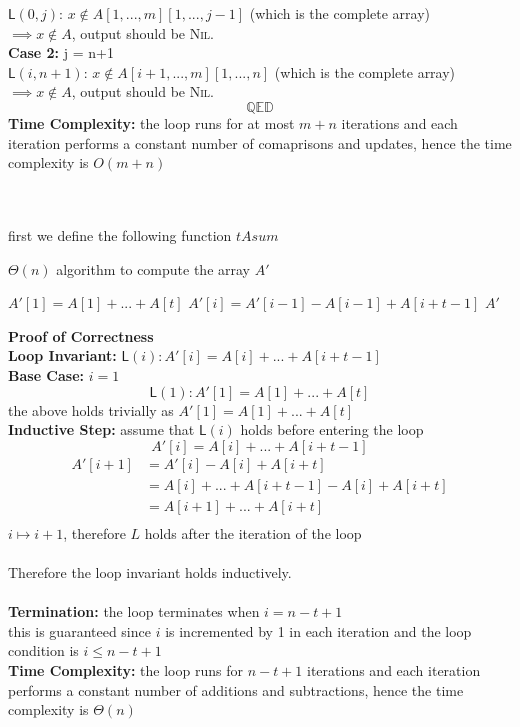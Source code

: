 \documentclass[12pt]{article}
\begin{document}
$\mathsf{L}(0, j)$: $x \notin A[1,...,m][1,...,j-1]$ (which is the complete array)\\
$\implies x \notin A$, output should be \textsc{Nil}.\\
\textbf{Case 2:} j = n+1\\
$\mathsf{L}(i, n+1)$: $x \notin A[i+1,...,m][1,...,n]$ (which is the complete array)\\
$\implies x \notin A$, output should be \textsc{Nil}.
$$\mathbb{Q} \mathbb{E} \mathbb{D} $$
\textbf{Time Complexity:} the loop runs for at most $m+n$ iterations and each iteration performs a constant number of comaprisons and updates, hence the time complexity is $O(m+n)$\\\\
\\
\begin{problem}

\end{problem}
first we define the following function $tAsum$
\begin{algorithm}[H]
    \caption{$\varTheta(n)$ algorithm to compute the array $A'$} 
\begin{algorithmic}[1]
    \State $A'[1] = A[1]+...+A[t]$
        \State $A'[i] = A'[i-1] - A[i-1] + A[i+t-1]$\;
    \EndFor
    \State \Return $A'$\;
\end{algorithmic}
\end{algorithm}
\textbf{Proof of Correctness}\\
\textbf{Loop Invariant:} $\mathsf{L}(i): A'[i] = A[i]+...+A[i+t-1]$\\
\textbf{Base Case:} $i = 1$\\
$$\mathsf{L}(1): A'[1] = A[1]+...+A[t]$$
the above holds trivially as $A'[1] = A[1]+...+A[t]$\\
\textbf{Inductive Step:} assume that $\mathsf{L}(i)$ holds before entering the loop\\
$$A'[i] = A[i]+...+A[i+t-1]$$
\begin{align*}
    A'[i+1] &= A'[i] - A[i] + A[i+t]\\
    &= A[i]+...+A[i+t-1] - A[i] + A[i+t]\\
    &= A[i+1]+...+A[i+t]\\
\end{align*}
$i \mapsto i+1$, therefore $L$ holds after the iteration of the loop\\
\\
Therefore the loop invariant holds inductively.\\
\\
\textbf{Termination:} the loop terminates when $i = n-t+1$\\
this is guaranteed since $i$ is incremented by 1 in each iteration and the loop condition is $i \leq n-t+1$\\
\textbf{Time Complexity:} the loop runs for $n-t+1$ iterations and each iteration performs a constant number of additions and subtractions, hence the time complexity is $\varTheta(n)$\\\\
\end{document}
